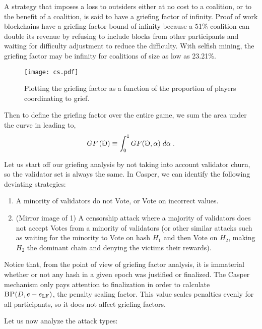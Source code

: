 \documentclass[12pt, final]{article}
\newcommand{\epoch}{\ensuremath{e}\space}
\newcommand{\gamesymbol}{\reflectbox{G}}
\newcommand{\epochLF}{\ensuremath{\epoch_{\textnormal{LF}}}\space}
\newcommand{\GF}[1]{GF\left( #1 \right)\space}
\newcommand{\BP}{\textsc{BP}\space}
\begin{document}
A strategy that imposes a loss to outsiders either at no cost to a coalition, or to the benefit of a coalition, is said to have a griefing factor of infinity. Proof of work blockchains have a griefing factor bound of infinity because a 51\% coalition can double its revenue by refusing to include blocks from other participants and waiting for difficulty adjustment to reduce the difficulty. With selfish mining, the griefing factor may be infinity for coalitions of size as low as 23.21\%. \cite{selfishminingBTC}



\begin{figure}[h!bt]
	\centering
	\texttt{[image: cs.pdf]}
	\caption{Plotting the griefing factor as a function of the proportion of players coordinating to grief.}
	\label{fig:GF}
\end{figure}

Then to define the griefing factor over the entire game, we sum the area under the curve in  leading to,
\begin{equation}
\GF{ \gamesymbol } \equiv \int_{0}^{1} GF( \gamesymbol, \alpha ) \; d\alpha \; .
\end{equation}


Let us start off our griefing analysis by not taking into account validator churn, so the validator set is always the same. In Casper, we can identify the following deviating strategies:

\begin{enumerate}
\item A minority of validators do not Vote, or Vote on incorrect values.
\item (Mirror image of 1) A censorship attack where a majority of validators does not accept Votes from a minority of validators (or other similar attacks such as waiting for the minority to Vote on hash $H_1$ and then Vote on $H_2$, making $H_2$ the dominant chain and denying the victims their rewards).
\end{enumerate}

Notice that, from the point of view of griefing factor analysis, it is immaterial whether or not any hash in a given epoch was justified or finalized. The Casper mechanism only pays attention to finalization in order to calculate $\BP(D, \epoch - \epochLF)$, the penalty scaling factor. This value scales penalties evenly for all participants, so it does not affect griefing factors.

Let us now analyze the attack types:
\end{document}
